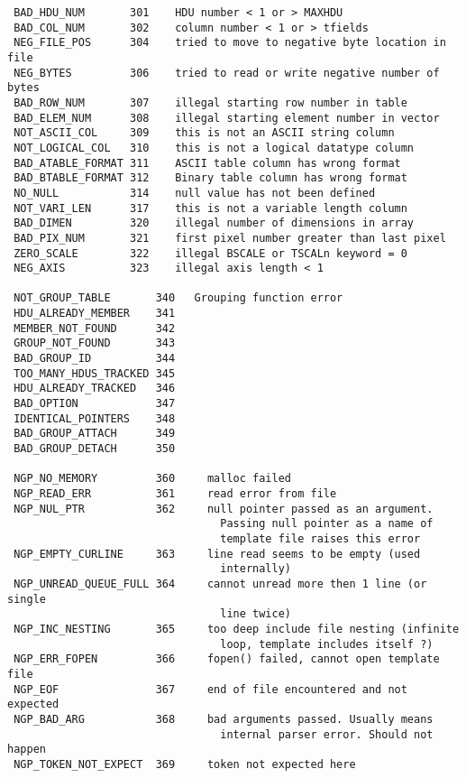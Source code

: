 \documentclass[11pt]{article}
\begin{document}
\begin{verbatim}
 BAD_HDU_NUM       301    HDU number < 1 or > MAXHDU
 BAD_COL_NUM       302    column number < 1 or > tfields
 NEG_FILE_POS      304    tried to move to negative byte location in file
 NEG_BYTES         306    tried to read or write negative number of bytes
 BAD_ROW_NUM       307    illegal starting row number in table
 BAD_ELEM_NUM      308    illegal starting element number in vector
 NOT_ASCII_COL     309    this is not an ASCII string column
 NOT_LOGICAL_COL   310    this is not a logical datatype column
 BAD_ATABLE_FORMAT 311    ASCII table column has wrong format
 BAD_BTABLE_FORMAT 312    Binary table column has wrong format
 NO_NULL           314    null value has not been defined
 NOT_VARI_LEN      317    this is not a variable length column
 BAD_DIMEN         320    illegal number of dimensions in array
 BAD_PIX_NUM       321    first pixel number greater than last pixel
 ZERO_SCALE        322    illegal BSCALE or TSCALn keyword = 0
 NEG_AXIS          323    illegal axis length < 1

 NOT_GROUP_TABLE       340   Grouping function error
 HDU_ALREADY_MEMBER    341
 MEMBER_NOT_FOUND      342
 GROUP_NOT_FOUND       343
 BAD_GROUP_ID          344
 TOO_MANY_HDUS_TRACKED 345
 HDU_ALREADY_TRACKED   346
 BAD_OPTION            347
 IDENTICAL_POINTERS    348
 BAD_GROUP_ATTACH      349
 BAD_GROUP_DETACH      350

 NGP_NO_MEMORY         360     malloc failed
 NGP_READ_ERR          361     read error from file
 NGP_NUL_PTR           362     null pointer passed as an argument.
                                 Passing null pointer as a name of
                                 template file raises this error
 NGP_EMPTY_CURLINE     363     line read seems to be empty (used
                                 internally)
 NGP_UNREAD_QUEUE_FULL 364     cannot unread more then 1 line (or single
                                 line twice)
 NGP_INC_NESTING       365     too deep include file nesting (infinite
                                 loop, template includes itself ?)
 NGP_ERR_FOPEN         366     fopen() failed, cannot open template file
 NGP_EOF               367     end of file encountered and not expected
 NGP_BAD_ARG           368     bad arguments passed. Usually means
                                 internal parser error. Should not happen
 NGP_TOKEN_NOT_EXPECT  369     token not expected here


\end{verbatim}
\end{document}

